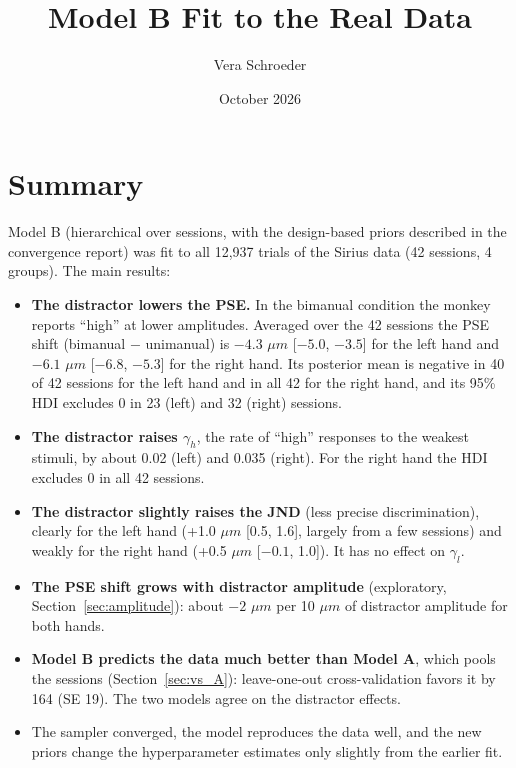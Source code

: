 \documentclass[11pt]{article}
\title{Model B Fit to the Real Data}
\author{Vera Schroeder}
\date{October 2026}
\begin{document}
\maketitle

\section{Summary}

Model B (hierarchical over sessions, with the design-based priors described in
the convergence report) was fit to all 12{,}937 trials of the Sirius data
(42 sessions, 4 groups). The main results:

\begin{itemize}
  \item \textbf{The distractor lowers the PSE.} In the bimanual condition the
        monkey reports ``high'' at lower amplitudes. Averaged over the 42 sessions
        the PSE shift (bimanual $-$ unimanual) is $-4.3$ $\mu m$ [$-5.0$, $-3.5$]
        for the left hand and $-6.1$ $\mu m$ [$-6.8$, $-5.3$] for the right hand.
        Its posterior mean is negative in 40 of 42 sessions for the left hand and
        in all 42 for the right hand, and its 95\% HDI excludes 0 in 23 (left) and
        32 (right) sessions.
  \item \textbf{The distractor raises $\gamma_h$}, the rate of ``high''
        responses to the weakest stimuli, by about 0.02 (left) and 0.035
        (right). For the right hand the HDI excludes 0 in all 42 sessions.
  \item \textbf{The distractor slightly raises the JND} (less precise
        discrimination), clearly for the left hand (+1.0 $\mu m$ [0.5, 1.6],
        largely from a few sessions) and weakly for the right hand
        (+0.5 $\mu m$ [$-0.1$, 1.0]). It has no effect on $\gamma_l$.
  \item \textbf{The PSE shift grows with distractor amplitude} (exploratory,
        Section~\ref{sec:amplitude}): about $-2$ $\mu m$ per 10 $\mu m$ of
        distractor amplitude for both hands.
  \item \textbf{Model B predicts the data much better than Model A}, which pools
        the sessions (Section~\ref{sec:vs_A}): leave-one-out cross-validation favors
        it by 164 (SE 19). The two models agree on the distractor effects.
  \item The sampler converged, the model reproduces the data well, and the new
        priors change the hyperparameter estimates only slightly from the
        earlier fit.
\end{itemize}
\end{document}
